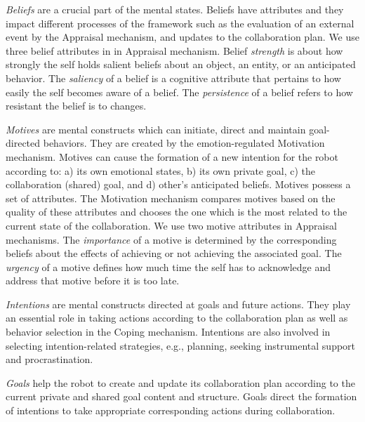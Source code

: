 \documentclass{article}
\begin{document}
\textit{Beliefs} are a crucial part of the mental states. Beliefs have
attributes and they impact different processes of the framework such as the
evaluation of an external event by the Appraisal mechanism, and updates to the
collaboration plan. We use three belief attributes in in Appraisal mechanism.
Belief \textit{strength} is about how strongly the self holds salient beliefs
about an object, an entity, or an anticipated behavior. The \textit{saliency} of
a belief is a cognitive attribute that pertains to how easily the self becomes
aware of a belief. The \textit{persistence} of a belief refers to how resistant
the belief is to changes.

\textit{Motives} are mental constructs which can initiate, direct and maintain
goal-directed behaviors. They are created by the emotion-regulated Motivation
mechanism. Motives can cause the formation of a new intention for the robot
according to: a) its own emotional states, b) its own private goal, c) the
collaboration (shared) goal, and d) other's anticipated beliefs. Motives possess
a set of attributes. The Motivation mechanism compares motives based on the
quality of these attributes and chooses the one which is the most related to the
current state of the collaboration. We use two motive attributes in Appraisal
mechanisms. The \textit{importance} of a motive is determined by the
corresponding beliefs about the effects of achieving or not achieving the
associated goal. The \textit{urgency} of a motive defines how much time the self
has to acknowledge and address that motive before it is too late.

\textit{Intentions} are mental constructs directed at goals and future actions.
They play an essential role in taking actions according to the collaboration
plan as well as behavior selection in the Coping mechanism. Intentions are
also involved in selecting intention-related strategies, e.g., planning, seeking
instrumental support and procrastination. 


\textit{Goals} help the robot to create and update its collaboration plan
according to the current private and shared goal content and structure. Goals
direct the formation of intentions to take appropriate corresponding actions
during collaboration. 
\end{document}
